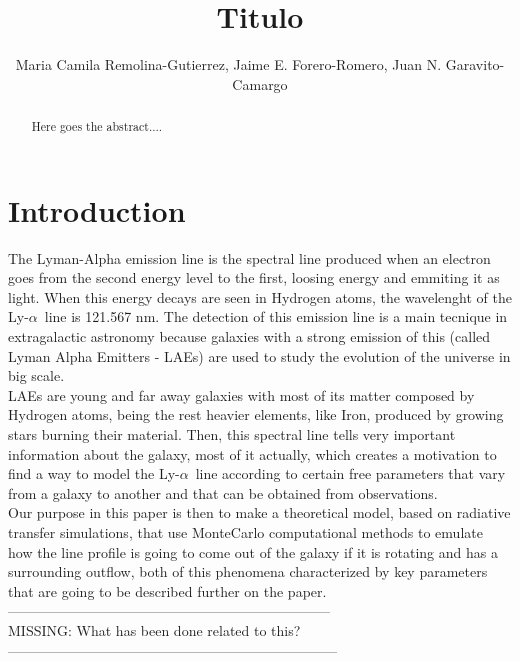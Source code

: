 \documentclass{emulateapj}
\newcommand{\lya}{{Ly-$\alpha$~}}
\begin{document}
\title{Titulo} 


\author{ Maria Camila Remolina-Gutierrez, Jaime E. Forero-Romero, Juan N. Garavito-Camargo}

\begin{abstract}
Here goes the abstract....
\end{abstract}

\section{Introduction}
\label{sec:intro}

The Lyman-Alpha emission line is the spectral line produced when an electron goes from the second energy level to the first, loosing energy and emmiting it as light. When this energy decays are seen in Hydrogen atoms, the wavelenght of the \lya line is 121.567 nm. The detection of this emission line is a main tecnique in extragalactic astronomy because galaxies with a strong emission of this (called Lyman Alpha Emitters - LAEs) are used to study the evolution of the universe in big scale. \\

LAEs are young and far away galaxies with most of its matter composed by Hydrogen atoms, being the rest heavier elements, like Iron, produced by growing stars burning their material. Then, this spectral line tells very important information about the galaxy, most of it actually, which creates a motivation to find a way to model the \lya line according to certain free parameters that vary from a galaxy to another and that can be obtained from observations. \\

Our purpose in this paper is then to make a theoretical model, based on radiative transfer simulations, that use MonteCarlo computational methods to emulate how the line profile is going to come out of the galaxy if it is rotating and has a surrounding outflow, both of this phenomena characterized by key parameters that are going to be described further on the paper. \\

---------------------------------------------------------------------\\
MISSING: What has been done related to this?\\
-----------------------------------------------------------------------\\
\end{document}
